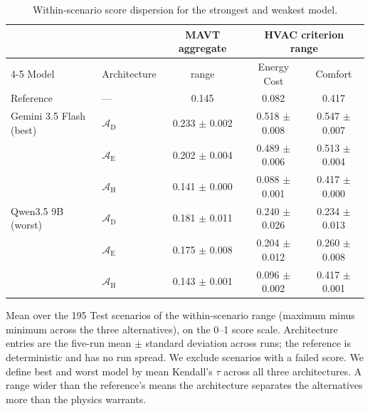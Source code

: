 \documentclass[final,3p,times]{elsarticle}
\begin{document}
\begin{table}[htbp]
\caption{Within-scenario score dispersion for the strongest and weakest model.}
\label{tab:dispersion}
\centering
\begin{threeparttable}
  \centering
  \footnotesize
  \begin{tabular}{llccc}
    \toprule
    & & MAVT aggregate & \multicolumn{2}{c}{HVAC criterion range} \\
    \cmidrule(lr){4-5}
    Model & Architecture & range & Energy Cost & Comfort \\
    \midrule
    Reference & --- & 0.145 & 0.082 & 0.417 \\
    \midrule
    Gemini 3.5 Flash (best) & $\mathcal{A}_{\text{D}}$ & 0.233 $\pm$ 0.002 & 0.518 $\pm$ 0.008 & 0.547 $\pm$ 0.007 \\
     & $\mathcal{A}_{\text{E}}$ & 0.202 $\pm$ 0.004 & 0.489 $\pm$ 0.006 & 0.513 $\pm$ 0.004 \\
     & $\mathcal{A}_{\text{H}}$ & 0.141 $\pm$ 0.000 & 0.088 $\pm$ 0.001 & 0.417 $\pm$ 0.000 \\
    \addlinespace
    Qwen3.5 9B (worst) & $\mathcal{A}_{\text{D}}$ & 0.181 $\pm$ 0.011 & 0.240 $\pm$ 0.026 & 0.234 $\pm$ 0.013 \\
     & $\mathcal{A}_{\text{E}}$ & 0.175 $\pm$ 0.008 & 0.204 $\pm$ 0.012 & 0.260 $\pm$ 0.008 \\
     & $\mathcal{A}_{\text{H}}$ & 0.143 $\pm$ 0.001 & 0.096 $\pm$ 0.002 & 0.417 $\pm$ 0.001 \\
    \bottomrule
  \end{tabular}
  \begin{tablenotes}
    \item Mean over the 195 Test scenarios of the within-scenario range (maximum minus minimum across the three alternatives), on the 0--1 score scale. Architecture entries are the five-run mean $\pm$ standard deviation across runs; the reference is deterministic and has no run spread. We exclude scenarios with a failed score. We define best and worst model by mean Kendall's $\tau$ across all three architectures. A range wider than the reference's means the architecture separates the alternatives more than the physics warrants.
  \end{tablenotes}
\end{threeparttable}
\end{table}
\FloatBarrier
\end{document}
